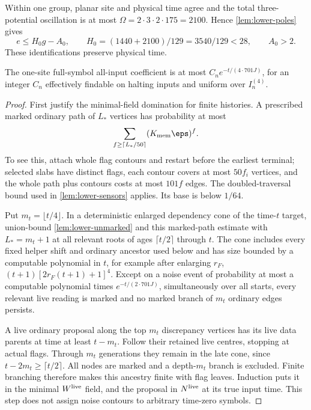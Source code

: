 Within one group, planar site and physical time agree and the total three-potential oscillation is at most $\Omega=2\cdot3\cdot2\cdot175=2100$. Hence \cref{lem:lower-poles} gives
\[
 e\le H_0g-A_0,\qquad H_0=(1440+2100)/129=3540/129<28,
 \qquad A_0>2.                                                \tag{L.5}\label{eq:lower-groups}
\]
These identifications preserve physical time.

\begin{lemma}\label{lem:lower-full}
The one-site full-symbol all-input coefficient is at most $C_ne^{-t/(4\cdot701J)}$, for an integer $C_n$ effectively findable on halting inputs and uniform over $I_n^{(4)}$.
\end{lemma}
\begin{proof}
First justify the minimal-field domination for finite histories. A prescribed marked ordinary path of $L_*$ vertices has probability at most
\[
 \sum_{f\ge\lceil L_*/50\rceil}(K_{\rm mem}\eps)^f.
\]
To see this, attach whole flag contours and restart before the earliest terminal; selected slabs have distinct flags, each contour covers at most $50f_i$ vertices, and the whole path plus contours costs at most $101f$ edges. The doubled-traversal bound used in \cref{lem:lower-sensors} applies. Its base is below $1/64$.

Put $m_t=\lfloor t/4\rfloor$. In a deterministic enlarged dependency cone of the time-$t$ target, union-bound \cref{lem:lower-unmarked} and this marked-path estimate with $L_*=m_t+1$ at all relevant roots of ages $\lceil t/2\rceil$ through $t$. The cone includes every fixed helper shift and ordinary ancestor used below and has size bounded by a computable polynomial in $t$, for example after enlarging $r_F$, $(t+1)[2r_F(t+1)+1]^4$. Except on a noise event of probability at most a computable polynomial times $e^{-t/(2\cdot701J)}$, simultaneously over all starts, every relevant live reading is marked and no marked branch of $m_t$ ordinary edges persists.

A live ordinary proposal along the top $m_t$ discrepancy vertices has its live data parents at time at least $t-m_t$. Follow their retained live centres, stopping at actual flags. Through $m_t$ generations they remain in the late cone, since $t-2m_t\ge\lceil t/2\rceil$. All nodes are marked and a depth-$m_t$ branch is excluded. Finite branching therefore makes this ancestry finite with flag leaves. Induction puts it in the minimal $W^{\rm live}$ field, and the proposal in $N^{\rm live}$ at its true input time. This step does not assign noise contours to arbitrary time-zero symbols.


\end{proof}

